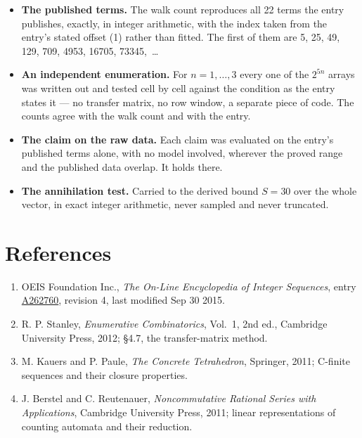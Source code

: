 \documentclass[11pt]{article}
\theoremstyle{definition}
\begin{document}
\begin{itemize}

\item {\bfseries The published terms.} The walk count reproduces all 22 terms the entry publishes, exactly, in integer arithmetic, with the index taken from the entry's stated offset (1) rather than fitted. The first of them are 5, 25, 49, 129, 709, 4953, 16705, 73345,~\dots

\item {\bfseries An independent enumeration.} For $n = 1,\dots,3$ every one of the $2^{5n}$ arrays was written out and tested cell by cell against the condition as the entry states it --- no transfer matrix, no row window, a separate piece of code. The counts agree with the walk count and with the entry.

\item {\bfseries The claim on the raw data.} Each claim was evaluated on the entry's published terms alone, with no model involved, wherever the proved range and the published data overlap. It holds there.

\item {\bfseries The annihilation test.} Carried to the derived bound $S = 30$ over the whole vector, in exact integer arithmetic, never sampled and never truncated.

\end{itemize}

\section{References}

\begin{enumerate}

\item OEIS Foundation Inc., \emph{The On-Line Encyclopedia of Integer Sequences}, entry \href{https://oeis.org/A262760}{A262760}, revision 4, last modified Sep 30 2015.

\item R. P. Stanley, \emph{Enumerative Combinatorics}, Vol.~1, 2nd ed., Cambridge University Press, 2012; \S4.7, the transfer-matrix method.

\item M. Kauers and P. Paule, \emph{The Concrete Tetrahedron}, Springer, 2011; C-finite sequences and their closure properties.

\item J. Berstel and C. Reutenauer, \emph{Noncommutative Rational Series with Applications}, Cambridge University Press, 2011; linear representations of counting automata and their reduction.

\end{enumerate}
\end{document}
